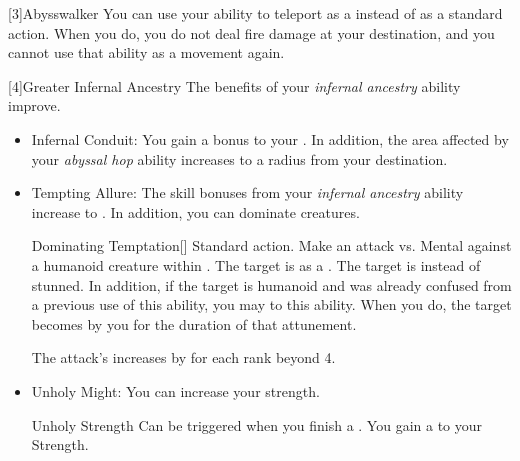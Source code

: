         [3]{Abysswalker} You can use your  ability to teleport as a  instead of as a standard action.
        When you do, you do not deal fire damage at your destination, and you  cannot use that ability as a movement again.

        [4]{Greater Infernal Ancestry} The benefits of your \textit{infernal ancestry} ability improve.
        \begin{itemize}
            \item Infernal Conduit: You gain a  bonus to your .
                In addition, the area affected by your \textit{abyssal hop} ability increases to a \smallarea radius from your destination.
            \item Tempting Allure: The skill bonuses from your \textit{infernal ancestry} ability increase to .
                In addition, you can dominate creatures.
                \begin{magicalactiveability}{Dominating Temptation}[]
                    \abilityusagetime Standard action.
                    \rankline
                    Make an attack vs. Mental against a humanoid creature within \shortrange.
                    \hit The target is \stunned as a .
                    \crit The target is \confused instead of stunned.
                    In addition, if the target is humanoid and was already confused from a previous use of this ability, you may  to this ability.
                    When you do, the target becomes \dominated by you for the duration of that attunement.

                    \rankline
                    \noindent The attack's  increases by  for each rank beyond 4.
                \end{magicalactiveability}
            \item Unholy Might: You can increase your strength.
                \begin{magicalattuneability}{Unholy Strength}{}
                    \abilityusagetime Can be triggered when you finish a .
                    \rankline
                    You gain a   to your Strength.
                \end{magicalattuneability}
        \end{itemize}

